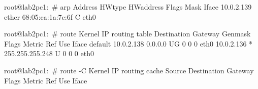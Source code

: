 root@lab2pc1:~# arp
Address                  HWtype  HWaddress           Flags Mask            Iface
10.0.2.139               ether   68:05:ca:1a:7c:6f   C                     eth0


root@lab2pc1:~# route
Kernel IP routing table
Destination     Gateway         Genmask         Flags Metric Ref    Use Iface
default         10.0.2.138      0.0.0.0         UG    0      0        0 eth0
10.0.2.136      *               255.255.255.248 U     0      0        0 eth0


root@lab2pc1:~# route -C
Kernel IP routing cache
Source          Destination     Gateway         Flags Metric Ref    Use Iface
